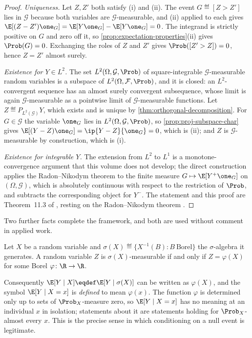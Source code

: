 \begin{proof}
	\emph{Uniqueness.} Let $Z,Z'$ both satisfy (i) and (ii). The event
	$G\eqdef[Z>Z']$ lies in $\mathcal{G}$ because both variables are $\mathcal{G}$-measurable, and
	(ii) applied to each gives $\E[(Z-Z')\one_G]=\E[Y\one_G]-\E[Y\one_G]=0$. The
	integrand is strictly positive on $G$ and zero off it, so
	\autoref{prop:expectation-properties}(ii) gives $\Prob(G)=0$. Exchanging the
	roles of $Z$ and $Z'$ gives $\Prob([Z'>Z])=0$, hence $Z=Z'$ almost surely.

	\emph{Existence for $Y\in L^{2}$.} The set
	$L^{2}(\Omega,\mathcal{G},\Prob)$ of square-integrable $\mathcal{G}$-measurable random variables
	is a subspace of $L^{2}(\Omega,\mathcal{F},\Prob)$, and it is closed: an $L^{2}$-convergent
	sequence has an almost surely convergent subsequence, whose limit is again
	$\mathcal{G}$-measurable as a pointwise limit of $\mathcal{G}$-measurable functions. Let
	$Z\eqdef P_{L^{2}(\mathcal{G})}Y$, which exists and is unique by
	\autoref{thm:orthogonal-decomposition}. For $G\in\mathcal{G}$ the variable $\one_G$ lies
	in $L^{2}(\Omega,\mathcal{G},\Prob)$, so \autoref{prop:proj-subspace-char} gives
	$\E[(Y-Z)\one_G]=\ip{Y-Z}{\one_G}=0$, which is (ii); and $Z$ is
	$\mathcal{G}$-measurable by construction, which is (i).

	\emph{Existence for integrable $Y$.} The extension from $L^{2}$ to $L^{1}$ is a
	monotone-convergence argument that this volume does not develop; the direct
	construction applies the Radon--Nikodym theorem to the finite measure
	$G\mapsto\E[Y^{+}\one_G]$ on $(\Omega,\mathcal{G})$, which is absolutely continuous with
	respect to the restriction of $\Prob$, and subtracts the corresponding object
	for $Y^{-}$. The statement and this proof are Theorem~11.3 of
	\textcite[p.~230]{legall2022measure}, resting on the Radon--Nikodym theorem
	\autocite[Thm.~4.11, p.~75]{legall2022measure}.
\end{proof}

Two further facts complete the framework, and both are used without comment in
applied work.

\begin{theorem}\label{thm:doob-dynkin}
	Let $X$ be a random variable and $\sigma(X)\eqdef\{X^{-1}(B) : B\
		\text{Borel}\}$ the $\sigma$-algebra it generates. A random variable $Z$ is
	$\sigma(X)$-measurable if and only if $Z=\varphi(X)$ for some Borel
	$\varphi\colon\R\to\R$.
\end{theorem}

Consequently $\E[Y\mid X]\eqdef\E[Y\mid\sigma(X)]$ can be written as $\varphi(X)$,
and the symbol $\E[Y\mid X=x]$ is \emph{defined} to mean $\varphi(x)$. The
function $\varphi$ is determined only up to sets of $\Prob_X$-measure zero, so
$\E[Y\mid X=x]$ has no meaning at an individual $x$ in isolation; statements about
it are statements holding for $\Prob_X$-almost every $x$. This is the precise
sense in which conditioning on a null event is legitimate.

